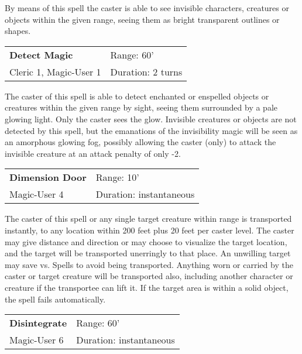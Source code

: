 \documentclass[a4paper,twoside,openany,10pt]{book}
\begin{document}
\begin{multicols}{2}
By means of this spell the caster is able to see invisible characters, creatures or objects within the given range, seeing them as bright transparent outlines or shapes.

\smallskip\begin{flushleft} 
	\begin{tabularx}{0.45\textwidth}{@{}m{3.5cm}m{5.5cm}@{}} 
		\textbf{Detect Magic} & Range: 60'\\
Cleric 1, Magic-User 1 &Duration: 2 turns\\
	\end{tabularx}\end{flushleft}

The caster of this spell is able to detect enchanted or enspelled objects or creatures within the given range by sight, seeing them surrounded by a pale glowing light. Only the caster sees the glow. Invisible creatures or objects are not detected by this spell, but the emanations of the invisibility magic will be seen as an amorphous glowing fog, possibly allowing the caster (only) to attack the invisible creature at an attack penalty of only -2.

\smallskip\begin{flushleft} 
	\begin{tabularx}{0.45\textwidth}{@{}m{3.5cm}m{5.5cm}@{}} 
		\textbf{Dimension Door} & Range: 10'\\
Magic-User 4 &Duration: instantaneous\\
	\end{tabularx}\end{flushleft}

The caster of this spell or any single target creature within range is transported instantly, to any location within 200 feet plus 20 feet per caster level. The caster may give distance and direction or may choose to visualize the target location, and the target will be transported unerringly to that place. An unwilling target may save vs. Spells to avoid being transported. Anything worn or carried by the caster or target creature will be transported also, including another character or creature if the transportee can lift it. If the target area is within a solid object, the spell fails automatically.

\smallskip\begin{flushleft} 
	\begin{tabularx}{0.45\textwidth}{@{}m{3.5cm}m{5.5cm}@{}} 
		\textbf{Disintegrate} & Range: 60'\\
		Magic-User 6 &Duration: instantaneous\\
	\end{tabularx}\end{flushleft}


\end{multicols}
\end{document}
